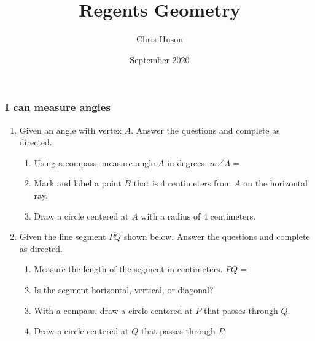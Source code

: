 \documentclass[12pt, twoside]{article}
\title{Regents Geometry}
\author{Chris Huson}
\date{September 2020}
\begin{document}
\subsubsection*{I can measure angles}
\begin{enumerate}
\item Given an angle with vertex $A$. Answer the questions and complete as directed.
  \begin{enumerate}
    \item Using a compass, measure angle $A$ in degrees. $m\angle A =$
    \bigskip
    \item Mark and label a point $B$ that is 4 centimeters from $A$ on the horizontal ray.
    \bigskip
    \item Draw a circle centered at $A$ with a radius of 4 centimeters. \bigskip
  \end{enumerate}
  \vspace{3cm}
  \begin{center}
  \end{center}

\item Given the line segment $\overline{PQ}$ shown below. Answer the questions and complete as directed.
  \begin{enumerate}
    \item Measure the length of the segment in centimeters. $PQ=$
    \bigskip
    \item Is the segment horizontal, vertical, or diagonal?
    \bigskip
    \item With a compass, draw a circle centered at $P$ that passes through $Q$.
    \bigskip
    \item Draw a circle centered at $Q$ that passes through $P$.
  \end{enumerate}
  \vspace{7cm}
  \begin{center}
  \end{center}


\end{enumerate}
\end{document}
